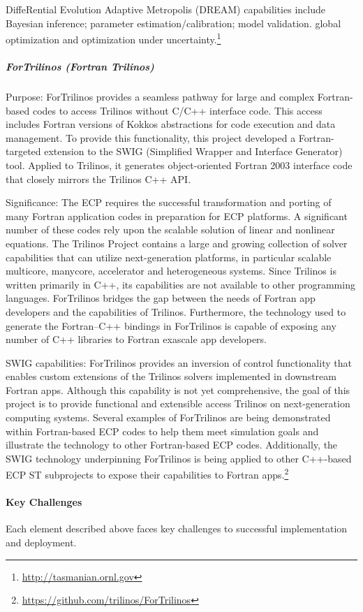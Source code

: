 DiffeRential Evolution Adaptive Metropolis (DREAM) capabilities include
Bayesian inference; parameter estimation/calibration; model validation.
global optimization and optimization under uncertainty.\footnote{\url{http://tasmanian.ornl.gov}}


\subparagraph{ForTrilinos (Fortran Trilinos)}

Purpose:
ForTrilinos provides a seamless pathway for large and complex Fortran-based
codes to access Trilinos without C/C++ interface code. This access includes
Fortran versions of Kokkos abstractions for code execution and data management.
To provide this functionality, this project developed a Fortran-targeted
extension to the SWIG (Simplified Wrapper and Interface Generator) tool.
Applied to Trilinos, it generates object-oriented Fortran 2003 interface code
that closely mirrors the Trilinos C++ API.

Significance:
The ECP requires the successful transformation and
porting of many Fortran application codes in preparation for ECP platforms. A
significant number of these codes rely upon the scalable solution of linear and
nonlinear equations. The Trilinos Project contains a large and growing
collection of solver capabilities that can utilize next-generation platforms, in
particular scalable multicore, manycore, accelerator and heterogeneous systems.
Since Trilinos is written primarily in C++, its capabilities are not available
to other programming languages. ForTrilinos bridges the gap between the
needs of Fortran app developers and the capabilities of Trilinos. Furthermore,
the technology used to generate the Fortran--C++ bindings in ForTrilinos is
capable of exposing any number of C++ libraries to Fortran exascale app
developers.


SWIG capabilities:
ForTrilinos provides an inversion of control functionality that enables custom
extensions of the Trilinos solvers implemented in downstream Fortran apps.
Although this capability is not yet comprehensive, the goal of this project is
to provide functional and extensible access Trilinos on next-generation
computing systems. Several examples of ForTrilinos are being demonstrated within
Fortran-based ECP codes to help them meet simulation goals and illustrate the
technology to other Fortran-based ECP codes. Additionally, the SWIG technology
underpinning ForTrilinos is being applied to other C++-based ECP ST subprojects
to expose their capabilities to Fortran apps.\footnote{\url{https://github.com/trilinos/ForTrilinos}}

\paragraph{Key Challenges}
Each element described above faces key challenges to successful implementation and deployment.


